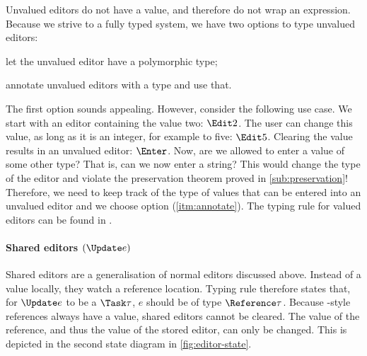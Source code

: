 Unvalued editors do not have a value,
and therefore do not wrap an expression.
Because we strive to a fully typed system,
we have two options to type unvalued editors:
\begin{enumerate*}
  \item let the unvalued editor have a polymorphic type;
  \item annotate unvalued editors with a type and use that. \label{itm:annotate}
\end{enumerate*}

The first option sounds appealing.
However, consider the following use case.
We start with an editor containing the value two: $\Edit 2$.
The user can change this value, as long as it is an integer,
for example to five: $\Edit 5$.
Clearing the value results in an unvalued editor: $\Enter$.
Now, are we allowed to enter a value of some other type?
That is, can we now enter a string?
This would change the type of the editor
and violate the preservation theorem proved in \autoref{sub:preservation}!
Therefore,
we need to keep track of the type of values that can be entered into an unvalued editor
and we choose option (\ref{itm:annotate}).
The typing rule for valued editors can be found in .



\paragraph{Shared editors $(\Update e)$}

Shared editors are a generalisation of normal editors discussed above.
Instead of  a value locally,
they watch a reference location.
Typing rule  therefore states that,
for $\Update e$ to be a $\Task \tau$,
$e$ should be of type $\Reference \tau$.
Because \ML-style references always have a value,
shared editors cannot be cleared.
The value of the reference,
and thus the value of the stored editor,
can only be changed.
This is depicted in the second state diagram in \autoref{fig:editor-state}.

